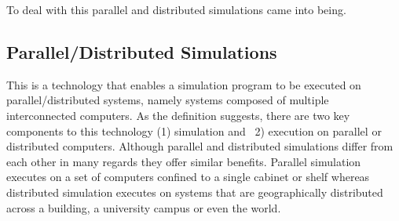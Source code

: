 \documentclass[12pt,a4paper]{article}
\begin{document}
	To deal with this parallel and distributed simulations came into being.
	
	\subsection{Parallel/Distributed Simulations}
	This is a technology that enables a simulation program to be executed on parallel/distributed systems, namely systems composed of multiple interconnected computers. As the definition suggests, there are two key components to this technology (1) simulation and ~2) execution on parallel or distributed computers. Although parallel and distributed simulations differ from each other in many regards they offer similar benefits. Parallel simulation executes on a set of computers confined to a single cabinet or shelf whereas distributed simulation executes on systems that are geographically distributed across a building, a university campus or even the world.
\end{document}
